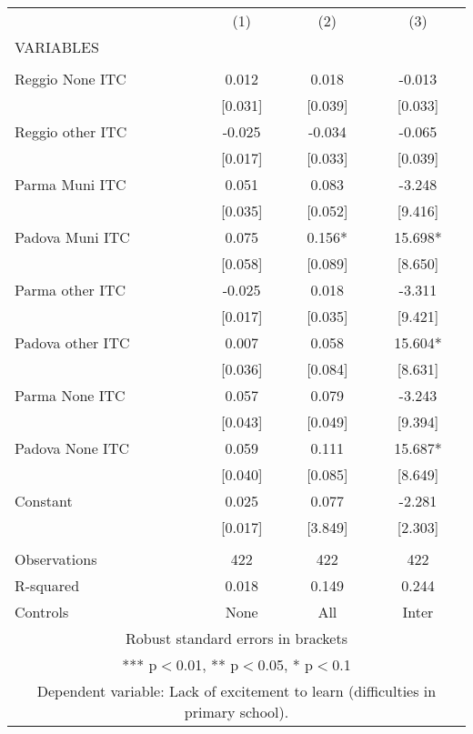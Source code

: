 \begin{tabular}{lccc} \hline
 & (1) & (2) & (3) \\
VARIABLES &  &  &  \\ \hline
 &  &  &  \\
Reggio None ITC & 0.012 & 0.018 & -0.013 \\
 & [0.031] & [0.039] & [0.033] \\
Reggio other ITC & -0.025 & -0.034 & -0.065 \\
 & [0.017] & [0.033] & [0.039] \\
Parma Muni ITC & 0.051 & 0.083 & -3.248 \\
 & [0.035] & [0.052] & [9.416] \\
Padova Muni ITC & 0.075 & 0.156* & 15.698* \\
 & [0.058] & [0.089] & [8.650] \\
Parma other ITC & -0.025 & 0.018 & -3.311 \\
 & [0.017] & [0.035] & [9.421] \\
Padova other ITC & 0.007 & 0.058 & 15.604* \\
 & [0.036] & [0.084] & [8.631] \\
Parma None ITC & 0.057 & 0.079 & -3.243 \\
 & [0.043] & [0.049] & [9.394] \\
Padova None ITC & 0.059 & 0.111 & 15.687* \\
 & [0.040] & [0.085] & [8.649] \\
Constant & 0.025 & 0.077 & -2.281 \\
 & [0.017] & [3.849] & [2.303] \\
 &  &  &  \\
Observations & 422 & 422 & 422 \\
R-squared & 0.018 & 0.149 & 0.244 \\
 Controls & None & All & Inter \\ \hline
\multicolumn{4}{c}{ Robust standard errors in brackets} \\
\multicolumn{4}{c}{ *** p$<$0.01, ** p$<$0.05, * p$<$0.1} \\
\multicolumn{4}{c}{ Dependent variable: Lack of excitement to learn (difficulties in primary school).} \\
\end{tabular}
